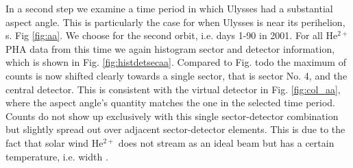 In a second step we examine a time period in which Ulysses had a substantial aspect angle. This is particularly the case for when Ulysses is near its perihelion, s. Fig \ref{fig:aa}. We choose for the second orbit, i.e. days 1-90 in 2001. For all $\mathrm{He^{2+}}$ PHA data from this time we again histogram sector and detector information, which is shown in Fig. \ref{fig:histdetsecaa}. Compared to Fig. todo the maximum of counts is now shifted clearly towards a single sector, that is sector No. 4, and the central detector. This is consistent with the virtual detector in Fig. \ref{fig:col_aa}, where the aspect angle's quantity matches the one in the selected time period. Counts do not show up exclusively with this single sector-detector combination but slightly spread out over adjacent sector-detector elements. This is due to the fact that solar wind $\mathrm{He^{2+}}$ does not stream as an ideal beam but has a certain temperature, i.e. width \citep[][,ch. 6.1]{prlss_2004}.


